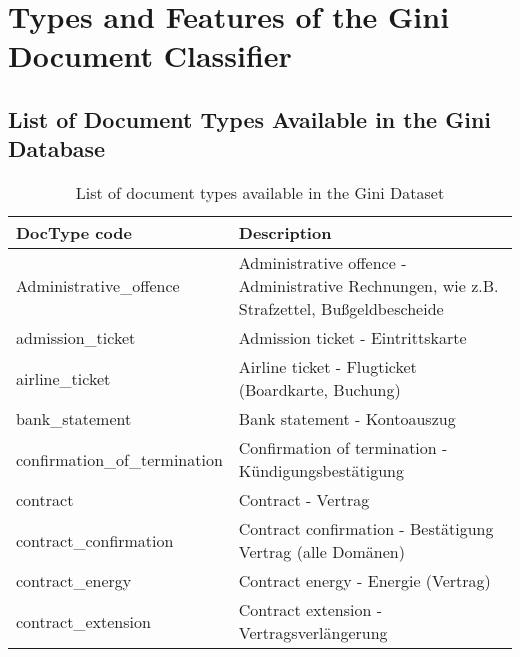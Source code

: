 \chapter{Types and Features of the Gini Document Classifier}
\label{chapter:available_doc_types}


\section{List of Document Types Available in the Gini Database}


\begin{longtable}[h]{|l|p{9cm}|}
\caption[List of document types available in the Gini Dataset]{List of document types available in the Gini Dataset} \label{tab:list_gini_doctypes} \\
\hline DocType code & Description \\
\hline Administrative\_offence                  &  Administrative offence - Administrative Rechnungen, wie z.B. Strafzettel, Bu{\ss}geldbescheide      \\
 admission\_ticket                        &  Admission ticket -  Eintrittskarte                                                                \\
 airline\_ticket                          &  Airline ticket -  Flugticket (Boardkarte, Buchung)                                                \\
 bank\_statement                          &  Bank statement -  Kontoauszug                                                                     \\
 confirmation\_of\_termination            &  Confirmation of termination -  K\"{u}ndigungsbest\"{a}tigung                                  \\
 contract                                 &  Contract -  Vertrag                                                                               \\
 contract\_confirmation                   &  Contract  confirmation -  Best\"{a}tigung Vertrag (alle Dom\"{a}nen)                          \\
 contract\_energy                         &  Contract  energy  - Energie (Vertrag)                                                             \\
 contract\_extension                      &  Contract  extension -  Vertragsverl\"{a}ngerung                                                 \\

\end{longtable}
